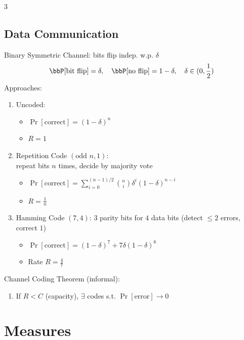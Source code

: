\documentclass[12pt, a4paper]{article}
\begin{document}
\begin{multicols*}{3}
\subsection{Data Communication}
Binary Symmetric Channel: bits flip indep. w.p. $\delta$
\begin{align*}\vspace{-0.8em}
  \Pr[\text{bit flip}] = \delta,\quad \Pr[\text{no flip}] = 1-\delta,\quad\delta \in (0, \frac{1}{2})
\end{align*}
Approaches:
\begin{enumerate}[\roman*.]
  \item Uncoded:
    \begin{itemize}[leftmargin=*]\vspace{3pt}
      \item $\Pr[\text{correct}] = (1-\delta)^n$
      \item $R=1$
    \end{itemize}
  \item Repetition Code $(\text{odd }n,1)$:\\repeat bits $n$ times, decide by majority vote
    \begin{itemize}[leftmargin=*]\vspace{3pt}
      \item $\Pr[\text{correct}] = \sum_{i=0}^{(n-1)/2}\binom{n}{i}\delta^i(1-\delta)^{n-i}$
      \item $R=\frac{1}{n}$
    \end{itemize}

  \item Hamming Code $(7,4)$: $3$ parity bits for $4$ data bits (detect $\leq 2$ errors, correct $1$)
    \begin{itemize}[leftmargin=*]\vspace{3pt}
      \item $\Pr[\text{correct}] = (1-\delta)^7 + 7\delta(1-\delta)^6$
      \item Rate $R=\frac{4}{7}$
    \end{itemize}
\end{enumerate}

Channel Coding Theorem (informal):
\begin{enumerate}[\roman*.]
  \item If $R < C$ (capacity), $\exists$ codes s.t. $\Pr[\text{error}] \to 0$
\end{enumerate}
\vspace{-1em}
\colbreak
\section{Measures}

\end{multicols*}
\end{document}
